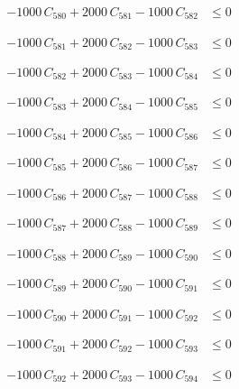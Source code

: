 \documentclass[a4paper,11pt]{article}
\begin{document}
\begin{align}
-1000\,C_{580} + 2000\,C_{581} - 1000\,C_{582} &\leq 0 \nonumber
\end{align}

\begin{align}
-1000\,C_{581} + 2000\,C_{582} - 1000\,C_{583} &\leq 0 \nonumber
\end{align}

\begin{align}
-1000\,C_{582} + 2000\,C_{583} - 1000\,C_{584} &\leq 0 \nonumber
\end{align}

\begin{align}
-1000\,C_{583} + 2000\,C_{584} - 1000\,C_{585} &\leq 0 \nonumber
\end{align}

\begin{align}
-1000\,C_{584} + 2000\,C_{585} - 1000\,C_{586} &\leq 0 \nonumber
\end{align}

\begin{align}
-1000\,C_{585} + 2000\,C_{586} - 1000\,C_{587} &\leq 0 \nonumber
\end{align}

\begin{align}
-1000\,C_{586} + 2000\,C_{587} - 1000\,C_{588} &\leq 0 \nonumber
\end{align}

\begin{align}
-1000\,C_{587} + 2000\,C_{588} - 1000\,C_{589} &\leq 0 \nonumber
\end{align}

\begin{align}
-1000\,C_{588} + 2000\,C_{589} - 1000\,C_{590} &\leq 0 \nonumber
\end{align}

\begin{align}
-1000\,C_{589} + 2000\,C_{590} - 1000\,C_{591} &\leq 0 \nonumber
\end{align}

\begin{align}
-1000\,C_{590} + 2000\,C_{591} - 1000\,C_{592} &\leq 0 \nonumber
\end{align}

\begin{align}
-1000\,C_{591} + 2000\,C_{592} - 1000\,C_{593} &\leq 0 \nonumber
\end{align}

\begin{align}
-1000\,C_{592} + 2000\,C_{593} - 1000\,C_{594} &\leq 0 \nonumber
\end{align}
\end{document}
